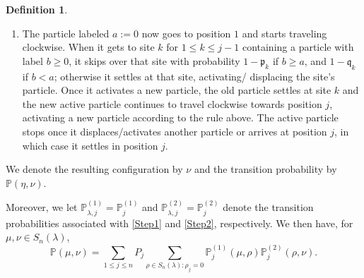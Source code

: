\documentclass[12pt]{amsart}
\theoremstyle{definition}
\newtheorem{definition}[thm]{Definition}
\newcommand{\PP}{\mathbb P}
\newcommand{\PPone}[1]{\mathbb P^{(1)}_{#1}}
\newcommand{\PPtwo}[1]{\mathbb P^{(2)}_{#1}}
\newcommand{\mfp}{\mathfrak p}
\newcommand{\mfq}{\mathfrak q}
\def\LW#1{(\textcolor{teal}{LW:#1})}
\begin{document}
\begin{definition}
\begin{enumerate}[label=(Step \arabic*)]
   \item\label{Step2}%
   The particle labeled $a:=0$ %
   now goes to position $1$ and starts traveling clockwise.
   When it gets to site $k$ for $1\leq k\leq j-1$ containing a particle with label $b \geq 0$, it 
   skips over that site with probability
       $1-\mfp_k$ 
       if $b\geq a$,
       and $1-\mfq_k$ if $b<a$;
      otherwise it settles at that site, activating/ displacing the site's particle.
Once it activates a new particle, 
the old particle settles at site $k$ and the new active particle continues to travel clockwise towards position $j$, activating a new particle according to the rule above. %
   The active particle stops once it displaces/activates another particle or arrives at position $j$, in which case it settles in position $j$.  %
\end{enumerate}
We denote the resulting configuration by
$\nu$ and the transition probability by %
$\PP(\eta,\nu)$.

Moreover, we let $\PPone{\lambda,j}=\PPone{j}$ and $\PPtwo{\lambda,j}=\PPtwo{j}$ denote the transition probabilities associated with \ref{Step1} and \ref{Step2}, respectively. We then have, for $\mu,\nu\in S_n(\lambda)$, %
$$\PP(\mu,\nu)=\sum_{1\leq j\leq n}P_j\sum_{\rho\in S_n(\lambda):\rho_j=0}\PPone{j}(\mu,\rho)\PPtwo{j}(\rho,\nu).$$
\end{definition}
\end{document}
